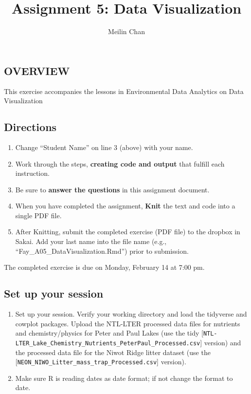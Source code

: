 \documentclass[
]{article}
\title{Assignment 5: Data Visualization}
\author{Meilin Chan}
\date{}
\providecommand{\tightlist}{%
  \setlength{\itemsep}{0pt}\setlength{\parskip}{0pt}}
\begin{document}
\maketitle

\hypertarget{overview}{%
\subsection{OVERVIEW}\label{overview}}

This exercise accompanies the lessons in Environmental Data Analytics on
Data Visualization

\hypertarget{directions}{%
\subsection{Directions}\label{directions}}

\begin{enumerate}
\def\labelenumi{\arabic{enumi}.}
\tightlist
\item
  Change ``Student Name'' on line 3 (above) with your name.
\item
  Work through the steps, \textbf{creating code and output} that fulfill
  each instruction.
\item
  Be sure to \textbf{answer the questions} in this assignment document.
\item
  When you have completed the assignment, \textbf{Knit} the text and
  code into a single PDF file.
\item
  After Knitting, submit the completed exercise (PDF file) to the
  dropbox in Sakai. Add your last name into the file name (e.g.,
  ``Fay\_A05\_DataVisualization.Rmd'') prior to submission.
\end{enumerate}

The completed exercise is due on Monday, February 14 at 7:00 pm.

\hypertarget{set-up-your-session}{%
\subsection{Set up your session}\label{set-up-your-session}}

\begin{enumerate}
\def\labelenumi{\arabic{enumi}.}
\item
  Set up your session. Verify your working directory and load the
  tidyverse and cowplot packages. Upload the NTL-LTER processed data
  files for nutrients and chemistry/physics for Peter and Paul Lakes
  (use the tidy
  {[}\texttt{NTL-LTER\_Lake\_Chemistry\_Nutrients\_PeterPaul\_Processed.csv}{]}
  version) and the processed data file for the Niwot Ridge litter
  dataset (use the
  {[}\texttt{NEON\_NIWO\_Litter\_mass\_trap\_Processed.csv}{]} version).
\item
  Make sure R is reading dates as date format; if not change the format
  to date.
\end{enumerate}
\end{document}
